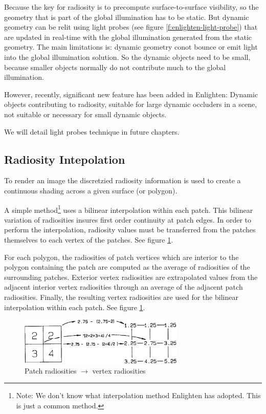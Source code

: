 Because the key for radiosity is to precompute surface-to-surface visibility, so the geometry that is part of the global illumination has to be static. But dynamic geometry can be relit using light probes (see figure \ref{f:enlighten-light-probe}) that are updated in real-time with the global illumination generated from the static geometry. The main limitations is: dynamic geometry conot bounce or emit light into the global illumination solution. So the dynamic objects need to be small, because smaller objects normally do not contribute much to the global illumination.

However, recently, significant new feature has been added in  Enlighten: Dynamic objects contributing to radiosity, suitable for large dynamic occluders in a scene, not suitable or necessary for small dynamic objects.

We will detail light probes technique in future chapters.



\subsection{Radiosity Intepolation}
To render an image the discretzied radiosity information is used to create a continuous shading across a given surface (or polygon). 

A simple method\footnote{Note: We don't know what interpolation method Enlighten has adopted. This is just a common method.} uses a bilinear interpolation within each patch. This bilinear variation of radiosities insures first order continuity at patch edges. In order to perform the interpolation, radiosity values must be transferred from the patches themselves to each vertex of the patches. See figure \ref{f:vertex-radiosities}.

For each polygon, the radiosities of patch vertices which are interior to the polygon containing the patch are computed as the average of radiosities of the surrounding patches. Exterior vertex radiosities are extrapolated values from the adjacent interior vertex radiosities through an average of the adjacent patch radiosities. Finally, the resulting vertex radiosities are used for the bilinear interpolation within each patch. See figure \ref{f:vertex-radiosities}.

\begin{figure}\label{f:vertex-radiosities}
	\begin{center}
		\includegraphics[width=0.7\textwidth]{graphics/gi/path-34}
	\end{center}
	\caption{Patch radiosities $\to$ vertex radiosities}
\end{figure}


